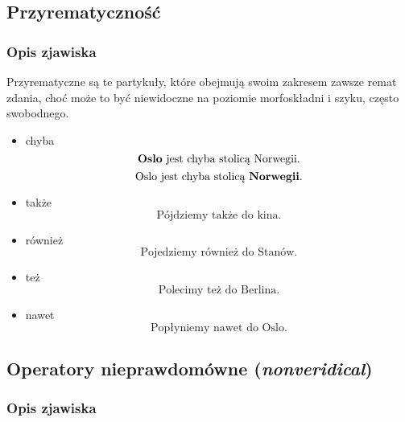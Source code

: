 \documentclass[a4paper, 12pt]{article}
\theoremstyle{remark}
\begin{document}
\subsection{Przyrematyczność}
{
\renewcommand\thesubsection{}
\renewcommand\thesubsubsection{}
\setcounter{subsection}{-1}
\subsubsection{Opis zjawiska} %
\label{sub:opis_zjawiska2}
}
Przyrematyczne są te partykuły, które obejmują swoim zakresem zawsze remat zdania, choć może to być niewidoczne na poziomie morfoskładni i szyku, często swobodnego.
\begin{itemize}
\item chyba
\begin{equation}
	\text{\textbf{Oslo} jest chyba stolicą Norwegii.}
\end{equation}
\begin{equation}
	\text{Oslo jest chyba stolicą \textbf{Norwegii}.}
\end{equation}
\item także
\begin{equation}
	\text{Pójdziemy także do kina.}
\end{equation}
\item również
\begin{equation}
	\text{Pojedziemy również do Stanów.}
\end{equation}
\item też
\begin{equation}
	\text{Polecimy też do Berlina.}
\end{equation}
\item nawet
\begin{equation}
	\text{Popłyniemy nawet do Oslo.}
\end{equation}


\end{itemize}


\subsection{Operatory nieprawdomówne (\emph{nonveridical})}
{
\renewcommand\thesubsection{}
\renewcommand\thesubsubsection{}
\setcounter{subsection}{-1}
\subsubsection{Opis zjawiska} %
\label{sub:opis_zjawiska3}
}
\end{document}
